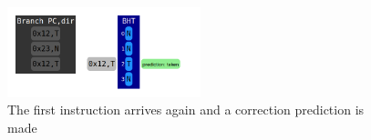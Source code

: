 \documentclass[12pt]{article}
\newenvironment{QandA}{\begin{enumerate}[label=\bfseries\alph*.]\bfseries}
                      {\end{enumerate}}
\newenvironment{answered}{\par\quad\normalfont}{}
\begin{document}
\begin{QandA}
\begin{answered}
\begin{figure}[!ht]
\centering
\includegraphics[width=0.5\textwidth]{chapter7_imgs/bbp/bbp004.png}
\caption{The first instruction arrives again and a correction prediction is made}
\label{bbp004}
\end{figure}


\end{answered}

\end{QandA}

\newpage 


\end{document}

